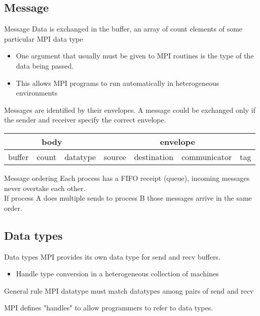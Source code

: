 \documentclass[aspectratio=43]{beamer}
\begin{document}
\subsection{Message}
\begin{frame}{Message}
\justifying
Data is exchanged in the buffer, an array of count elements of some particular MPI data type
\begin{itemize}
\item One argument that usually must be given to MPI routines is the type of the data being passed.
\item This allows MPI programs to run automatically in heterogeneous environments
\end{itemize}
Messages are identified by their envelopes. A message could be exchanged only if the sender and receiver specify the correct envelope.\\[5mm]
\begin{tabular}{|c|c|c||c|c|c|c|}
\hline
\multicolumn{3}{|c||}{body} & \multicolumn{4}{c|}{envelope} \\\hline
buffer & count & datatype & source & destination & communicator & tag\\\hline
\end{tabular}
\end{frame}

\begin{frame}{Message ordering}
\justifying
Each process has a FIFO receipt (queue), incoming messages never overtake each other.\\[5mm]

If process A does multiple sends to process B those messages arrive in the same order.
\end{frame}

\subsection{Data types}
\begin{frame}{Data types}
MPI provides its own data type for send and recv buffers.
\begin{itemize}
\item Handle type conversion in a heterogeneous collection of machines
\end{itemize}
\begin{red1block}{General rule}
MPI datatype must match datatypes among pairs of send and recv
\end{red1block}
MPI defines "handles" to allow programmers to refer to data types.
\end{frame}
\end{document}
